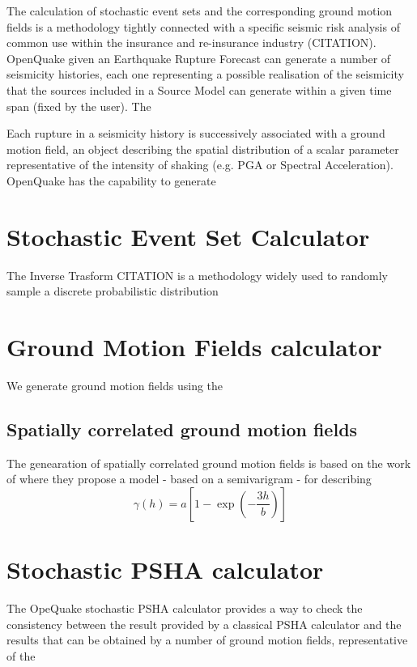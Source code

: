The calculation of stochastic event sets and the corresponding ground motion fields is a methodology tightly connected with a specific seismic risk analysis of common use within the insurance and re-insurance industry (CITATION). 
%
OpenQuake given an Earthquake Rupture Forecast can generate a number of seismicity histories, each one representing a possible realisation of the seismicity that the sources included in a Source Model can generate within a given time span (fixed by the user).
% 
The 

Each rupture in a seismicity history is successively associated with a ground motion field, an object describing the spatial distribution of a scalar parameter representative of the intensity of shaking (e.g. PGA or Spectral Acceleration). OpenQuake has the capability to generate 
%
\section{Stochastic Event Set Calculator}
The Inverse Trasform CITATION is a methodology widely used to randomly sample 
a discrete probabilistic distribution 

%
\section{Ground Motion Fields calculator} 
We generate ground motion fields using the 
%
\subsection{Spatially correlated ground motion fields}
The genearation of spatially correlated ground motion fields is based on the work of \citet{jayaram2009} where they propose a model - based on a semivarigram - for describing 
\begin{equation}
\gamma(h) = a \left[1-\exp\left(-\frac{3h}{b}\right)\right]
\end{equation}

%
\section{Stochastic PSHA calculator} 
The OpeQuake stochastic PSHA calculator provides a way to check the consistency between the result provided by a classical PSHA calculator and the results that can be obtained by a number of ground motion fields, representative of the 
